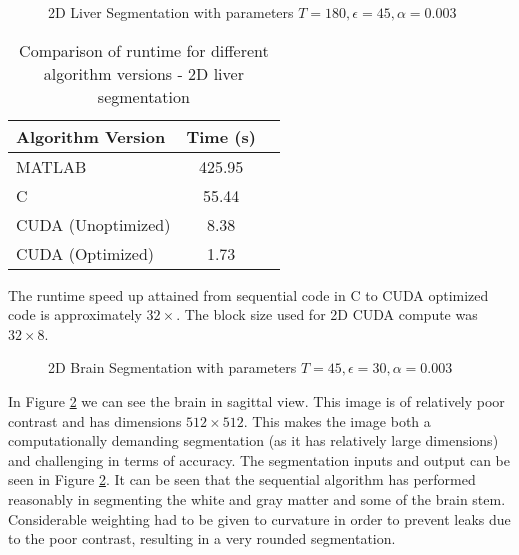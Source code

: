  
\begin{figure}[h]
  \begin{center}
  \end{center}
  \caption{2D Liver Segmentation with parameters $T = 180, \epsilon = 45, \alpha = 0.003$}
  \label{fig:liver}
\end{figure}

\begin{table}[h]
\centering
\begin{tabular}{ | l | c | r | }
	\hline
	Algorithm Version  & Time (s)\\ \hline
  MATLAB 						 & 425.95 \\
  C 								 & 55.44 \\
  CUDA (Unoptimized) & 8.38 \\
  CUDA (Optimized)   & 1.73  \\
  \hline
\end{tabular}\caption{Comparison of runtime for different algorithm versions - 2D liver segmentation}
\label{livertime}
\end{table}

The runtime speed up attained from sequential code in C to CUDA optimized code is approximately $32 \times$. The block size used for 2D CUDA compute was $32 \times 8$.


\begin{figure}[h]
  \begin{center}
  \end{center}
  \caption{2D Brain Segmentation with parameters $T = 45, \epsilon = 30, \alpha = 0.003$}
  \label{fig:brain}
\end{figure}

In Figure \ref{fig:brain} we can see the brain in sagittal view. This image is of relatively poor contrast and has dimensions $512 \times 512$. This makes the image both a computationally demanding segmentation (as it has relatively large dimensions) and challenging in terms of accuracy.
The segmentation inputs and output can be seen in Figure \ref{fig:brain}. It can be seen that the sequential algorithm has performed reasonably in segmenting the white and gray matter and some of the brain stem. Considerable weighting had to be given to curvature in order to prevent leaks due to the poor contrast, resulting in a very rounded segmentation. 

